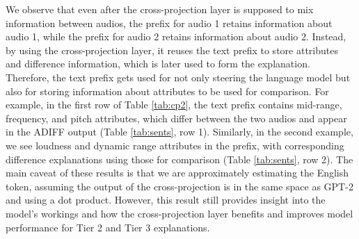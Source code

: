 \begin{table}[!ht]
\centering
{}
\caption{\small Parsed words and subwords from the interpreted prefix. The prefix here is the output of the cross-projection layer and the corresponding model outputs are shown in Table \ref{tab:sents}}
\label{tab:cp2}
\end{table}

We observe that even after the cross-projection layer is supposed to mix information between audios, the prefix for audio 1 retains information about audio 1, while the prefix for audio 2 retains information about audio 2. Instead, by using the cross-projection layer, it reuses the text prefix to store attributes and difference information, which is later used to form the explanation. Therefore, the text prefix gets used for not only steering the language model but also for storing information about attributes to be used for comparison. For example, in the first row of Table \ref{tab:cp2}, the text prefix contains mid-range, frequency, and pitch attributes, which differ between the two audios and appear in the ADIFF output (Table \ref{tab:sents}, row 1). Similarly, in the second example, we see loudness and dynamic range attributes in the prefix, with corresponding difference explanations using those for comparison (Table \ref{tab:sents}, row 2). The main caveat of these results is that we are approximately estimating the English token, assuming the output of the cross-projection is in the same space as GPT-2 and using a dot product. However, this result still provides insight into the model's workings and how the cross-projection layer benefits and improves model performance for Tier 2 and Tier 3 explanations.

